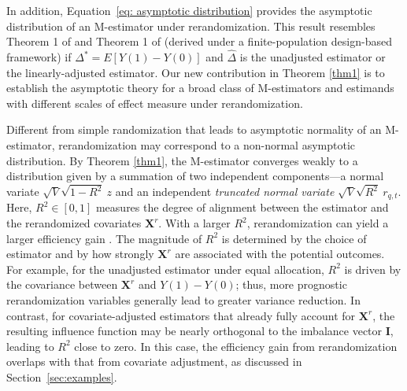 \documentclass[12pt]{article}
\newcommand{\bX}{\boldsymbol{X}}\newcommand{\bO}{\boldsymbol{O}}
\newcommand{\bI}{\boldsymbol{I}}
\begin{document}
In addition, Equation~\eqref{eq: asymptotic distribution} provides the asymptotic distribution of an M-estimator under rerandomization. 
This result resembles Theorem 1 of \cite{li2018asymptotic} and Theorem 1 of \cite{li2020rerandomization} (derived under a finite-population design-based framework) if $\Delta^*=E[Y(1)-Y(0)]$ and $\widehat{\Delta}$ is the unadjusted estimator or the linearly-adjusted estimator. 
Our new contribution in Theorem \ref{thm1} is to establish the asymptotic theory for a broad class of M-estimators and estimands with different scales of effect measure under rerandomization.%

Different from simple randomization that leads to asymptotic normality of an M-estimator, rerandomization may correspond to a non-normal asymptotic distribution. By Theorem \ref{thm1}, the M-estimator converges weakly to a distribution given by a summation of two independent components---a normal variate $\sqrt{V}\sqrt{1-R^2}\ z$ and an independent \emph{truncated normal variate} $\sqrt{V}\sqrt{R^2}\ r_{q,t}$. 
{Here, \(R^2\in[0,1]\) measures the degree of alignment between the estimator and the rerandomized covariates \(\bX^r\). With a larger \(R^2\), rerandomization can yield a larger efficiency gain \citep{li2018asymptotic}. The magnitude of \(R^2\) is determined by the choice of estimator and by how strongly \(\bX^r\) are associated with the potential outcomes. For example, for the unadjusted estimator under equal allocation, \(R^2\) is driven by the covariance between \(\bX^r\) and $Y(1)-Y(0)$; thus, more prognostic rerandomization variables generally lead to greater variance reduction. In contrast, for covariate-adjusted estimators that already fully account for \(\bX^r\), the resulting influence function may be nearly orthogonal to the imbalance vector \(\bI\), leading to \(R^2\) close to zero. In this case, the efficiency gain from rerandomization overlaps with that from covariate adjustment, as discussed in Section~\ref{sec:examples}.}

\end{document}

